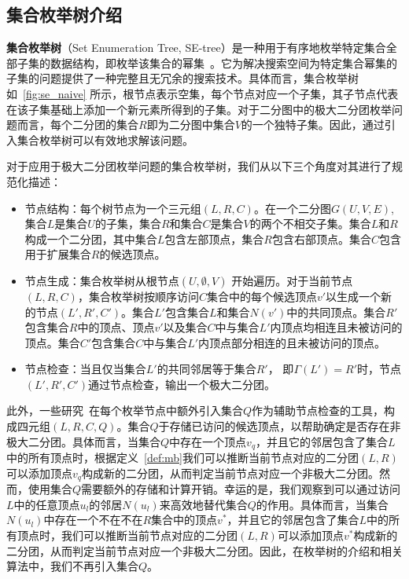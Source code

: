 
\subsection{集合枚举树介绍}

\textbf{集合枚举树}（Set Enumeration Tree, SE-tree）是一种用于有序地枚举特定集合全部子集的数据结构，即枚举该集合的幂集~\cite{SEtree92}。它为解决搜索空间为特定集合幂集的子集的问题提供了一种完整且无冗余的搜索技术。具体而言，集合枚举树如~\autoref{fig:se_naive} 所示，根节点表示空集，每个节点对应一个子集，其子节点代表在该子集基础上添加一个新元素所得到的子集。对于二分图中的极大二分团枚举问题而言，每个二分团的集合$R$即为二分图中集合$V$的一个独特子集。因此，通过引入集合枚举树可以有效地求解该问题。

对于应用于极大二分团枚举问题的集合枚举树，我们从以下三个角度对其进行了规范化描述：

\begin{itemize}
  \item 节点结构：每个树节点为一个三元组$(L,R,C)$。在一个二分图$G(U,V,E)$,集合$L$是集合$U$的子集，集合$R$和集合$C$是集合$V$的两个不相交子集。集合$L$和$R$构成一个二分团，其中集合$L$包含左部顶点，集合$R$包含右部顶点。集合$C$包含用于扩展集合$R$的候选顶点。
  \item 节点生成：集合枚举树从根节点$(U,\emptyset,V)$ 开始遍历。对于当前节点$(L,R,C)$，集合枚举树按顺序访问$C$集合中的每个候选顶点$v'$以生成一个新的节点$(L',R',C')$。集合$L'$包含集合$L$和集合$N(v')$中的共同顶点。集合$R'$包含集合$R$中的顶点、顶点$v'$以及集合$C$中与集合$L'$内顶点均相连且未被访问的顶点。集合$C'$包含集合$C$中与集合$L'$内顶点部分相连的且未被访问的顶点。
  \item 节点检查：当且仅当集合$L'$的共同邻居等于集合$R'$， 即$\Gamma(L')=R'$时，节点$(L',R',C')$通过节点检查，输出一个极大二分团。
\end{itemize}

此外，一些研究~\cite{iMBEA14,ooMBE22}在每个枚举节点中额外引入集合$Q$作为辅助节点检查的工具，构成四元组$(L,R,C,Q)$。集合$Q$于存储已访问的候选顶点，以帮助确定是否存在非极大二分团。具体而言，当集合$Q$中存在一个顶点$v_q$，并且它的邻居包含了集合$L$中的所有顶点时，根据定义~\ref{def:mb}我们可以推断当前节点对应的二分团$(L,R)$可以添加顶点$v_q$构成新的二分团，从而判定当前节点对应一个非极大二分团。然而，使用集合$Q$需要额外的存储和计算开销。幸运的是，我们观察到可以通过访问$L$中的任意顶点$u_l$的邻居$N(u_l)$来高效地替代集合$Q$的作用。具体而言，当集合$N(u_l)$中存在一个不在不在$R$集合中的顶点$v^*$，并且它的邻居包含了集合$L$中的所有顶点时，我们可以推断当前节点对应的二分团$(L,R)$可以添加顶点$v^*$构成新的二分团，从而判定当前节点对应一个非极大二分团。因此，在枚举树的介绍和相关算法中，我们不再引入集合$Q$。

